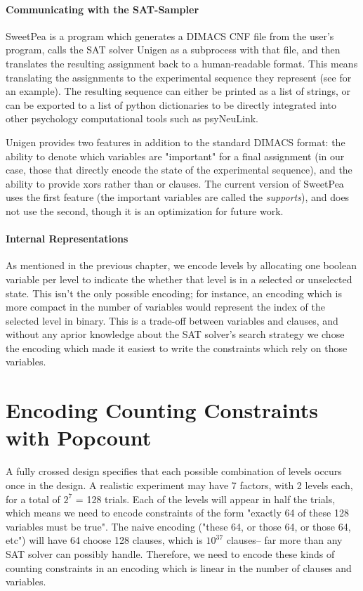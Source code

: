\paragraph*{Communicating with the SAT-Sampler}

SweetPea is a program which generates a DIMACS CNF file from the user's program, calls the SAT solver Unigen as a subprocess with that file, and then translates the resulting assignment back to a human-readable format. This means translating the assignments to the experimental sequence they represent (see  for an example). The resulting sequence can either be printed as a list of strings, or can be exported to a list of python dictionaries to be directly integrated into other psychology computational tools such as psyNeuLink.

Unigen provides two features in addition to the standard DIMACS format: the ability to denote which variables are "important" for a final assignment (in our case, those that directly encode the state of the experimental sequence), and the ability to provide xors rather than or clauses. The current version of SweetPea uses the first feature (the important variables are called the \emph{supports}), and does not use the second, though it is an optimization for future work.


\paragraph*{Internal Representations}

As mentioned in the previous chapter, we encode levels by allocating one boolean variable per level to indicate the whether that level is in a selected or unselected state. This isn't the only possible encoding; for instance, an encoding which is more compact in the number of variables would represent the index of the selected level in binary. This is a trade-off between variables and clauses, and without any aprior knowledge about the SAT solver's search strategy we chose the encoding which made it easiest to write the constraints which rely on those variables.


\section{Encoding Counting Constraints with Popcount}

A fully crossed design specifies that each possible combination of levels occurs once in the design. A realistic experiment may have 7 factors, with 2 levels each, for a total of $2^7$ = 128 trials. Each of the levels will appear in half the trials, which means we need to encode constraints of the form "exactly 64 of these 128 variables must be true". The naive encoding ("these 64, or those 64, or those 64, etc") will have 64 choose 128 clauses, which is $10^{37}$ clauses-- far more than any SAT solver can possibly handle. Therefore, we need to encode these kinds of counting constraints in an encoding which is linear in the number of clauses and variables.

